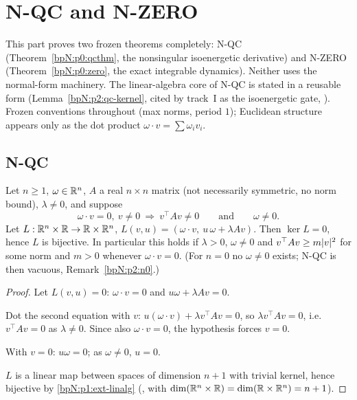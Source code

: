 \section{N-QC and N-ZERO}\label{bpN:p2}
\begingroup\sloppy

This part proves two frozen theorems completely: N-QC (Theorem~\ref{bpN:p0:qcthm}, the nonsingular isoenergetic derivative) and N-ZERO
(Theorem~\ref{bpN:p0:zero}, the exact integrable dynamics). Neither uses the normal-form machinery. The linear-algebra core of N-QC is stated
in a reusable form (Lemma~\ref{bpN:p2:qc-kernel}, cited by track~I as the isoenergetic gate, ). Frozen conventions throughout (max norms, period $1$);
Euclidean structure appears only as the dot product $\omega\cdot v=\sum\omega_iv_i$.

\subsection{N-QC}\label{bpN:p2:s-qc}

\begin{lemma}\label{bpN:p2:qc-kernel}
Let $n\ge1$, $\omega\in\mathbb{R}^n$, $A$ a real $n\times n$ matrix (not necessarily symmetric, no norm bound), $\lambda\ne0$, and suppose
\[\omega\cdot v=0,\ v\ne0\ \Longrightarrow\ v^{\!\top}Av\ne0\qquad\text{and}\qquad\omega\ne0.\]
Let $L:\mathbb{R}^n\times\mathbb{R}\to\mathbb{R}\times\mathbb{R}^n$, $L(v,u)=(\omega\cdot v,\ u\,\omega+\lambda Av)$. Then $\ker L=0$, hence $L$ is bijective.
In particular this holds if $\lambda>0$, $\omega\ne0$ and $v^\top Av\ge m\lvert v\rvert^2$ for some norm and $m>0$ whenever $\omega\cdot v=0$.
(For $n=0$ no $\omega\ne0$ exists; N-QC is then vacuous, Remark~\ref{bpN:p2:n0}.)
\end{lemma}
\begin{proof}
\label{stepN:p2:qk-eqs} Let $L(v,u)=0$: $\omega\cdot v=0$ and $u\omega+\lambda Av=0$.

\label{stepN:p2:qk-pair} Dot the second equation with $v$: $u(\omega\cdot v)+\lambda v^\top Av=0$, so $\lambda v^\top Av=0$, i.e.\ $v^\top Av=0$ as $\lambda\ne0$. Since also $\omega\cdot v=0$, the hypothesis forces $v=0$.

\label{stepN:p2:qk-scalar} With $v=0$: $u\omega=0$; as $\omega\ne0$, $u=0$.

\label{stepN:p2:qk-bij} $L$ is a linear map between spaces of dimension $n+1$ with trivial kernel, hence bijective by \ref{bpN:p1:ext-linalg} (, with $\dim(\mathbb{R}^n\times\mathbb{R})=\dim(\mathbb{R}\times\mathbb{R}^n)=n+1$).
\end{proof}

